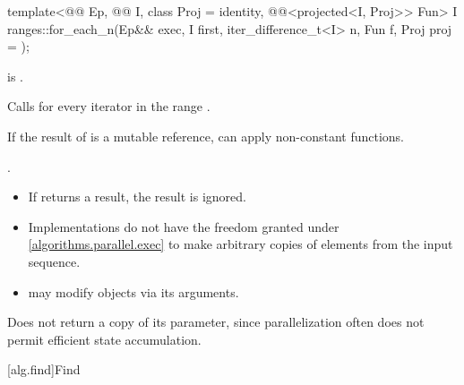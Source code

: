 \begin{itemdecl}
template<@@ Ep, @@ I, class Proj = identity,
         @@<projected<I, Proj>> Fun>
  I ranges::for_each_n(Ep&& exec, I first, iter_difference_t<I> n, Fun f, Proj proj = {});
\end{itemdecl}

\begin{itemdescr}
\pnum
\expects
{} is .

\pnum
\effects
Calls 
for every iterator 
in the range .
\begin{note}
If the result of  is a mutable reference,
 can apply non-constant functions.
\end{note}

\pnum
\returns
{}.

\pnum
\remarks
\begin{itemize}
\item
  If  returns a result, the result is ignored.
\item
  Implementations do not have the freedom granted under \ref{algorithms.parallel.exec}
  to make arbitrary copies of elements from the input sequence.
\item
   may modify objects via its arguments.
\end{itemize}
\begin{note}
Does not return a copy of its  parameter,
since parallelization often does not permit
efficient state accumulation.
\end{note}
\end{itemdescr}

[alg.find]{Find}

